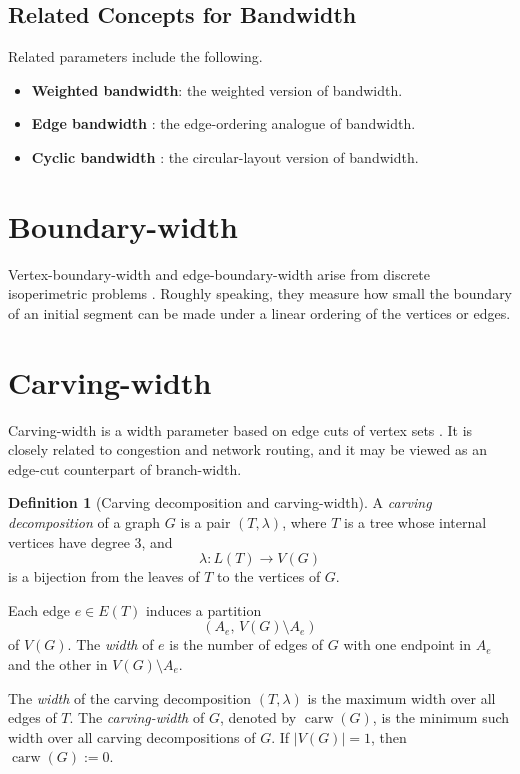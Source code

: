 \documentclass[10pt]{book}
\theoremstyle{definition}
\newtheorem{definition}[theorem]{Definition}
\begin{document}
\subsection{Related Concepts for Bandwidth}
Related parameters include the following.

\begin{itemize}
    \item \textbf{Weighted bandwidth}: the weighted version of bandwidth.
    \item \textbf{Edge bandwidth} \cite{pikhurko2006edge,lin2015new,akhtar2007edge}: the edge-ordering analogue of bandwidth.
    \item \textbf{Cyclic bandwidth} \cite{raspaud2000congestion}: the circular-layout version of bandwidth.
\end{itemize}

\section{Boundary-width}
Vertex-boundary-width and edge-boundary-width arise from discrete isoperimetric problems \cite{36}.  
Roughly speaking, they measure how small the boundary of an initial segment can be made under a linear ordering of the vertices or edges.

\section{Carving-width}
Carving-width is a width parameter based on edge cuts of vertex sets \cite{256,257,258}.  
It is closely related to congestion and network routing, and it may be viewed as an edge-cut counterpart of branch-width.

\begin{definition}[Carving decomposition and carving-width]
\cite{256,257,258}
A \emph{carving decomposition} of a graph \(G\) is a pair \((T,\lambda)\), where \(T\) is a tree whose internal vertices have degree \(3\), and
\[
\lambda: L(T)\to V(G)
\]
is a bijection from the leaves of \(T\) to the vertices of \(G\).

Each edge \(e\in E(T)\) induces a partition
\[
(A_e,\, V(G)\setminus A_e)
\]
of \(V(G)\).  
The \emph{width} of \(e\) is the number of edges of \(G\) with one endpoint in \(A_e\) and the other in \(V(G)\setminus A_e\).

The \emph{width} of the carving decomposition \((T,\lambda)\) is the maximum width over all edges of \(T\).  
The \emph{carving-width} of \(G\), denoted by \(\operatorname{carw}(G)\), is the minimum such width over all carving decompositions of \(G\).  
If \(|V(G)|=1\), then \(\operatorname{carw}(G):=0\).
\end{definition}
\end{document}
